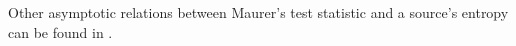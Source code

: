 Other asymptotic relations between Maurer's test statistic and a source's entropy can be found in \cite{wegenkittl2001entropy,choe2000average,abadi2004version,kim2014estimation,kim2018low}.
